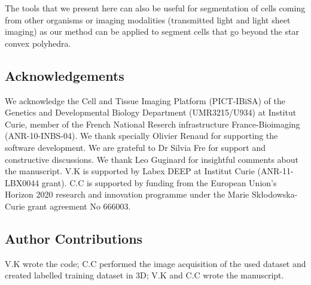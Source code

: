 \documentclass[letterpaper,compsoc,twoside]{IEEEtran}
\begin{document}
The tools that we present here can also be useful for segmentation of cells coming from other organisms or imaging modalities (transmitted light and light sheet imaging) as our method can be applied to segment cells that go beyond the star convex polyhedra.

\subsection{Acknowledgements%
  \label{acknowledgements}%
}


We acknowledge the Cell and Tissue Imaging Platform (PICT-IBiSA) of the Genetics and Developmental Biology Department (UMR3215/U934) at Institut Curie, member of the French National Reserch infrastructure France-Bioimaging (ANR-10-INBS-04). We thank specially Olivier Renaud for supporting the software development. We are grateful to Dr Silvia Fre for support and constructive discussions. We thank Leo Guginard for insightful comments about the manuscript. V.K is supported by Labex DEEP at Institut Curie (ANR-11- LBX0044 grant). C.C is supported by funding from the European Union's Horizon 2020 research and innovation programme under the Marie Skłodowska-Curie grant agreement No 666003.

\subsection{Author Contributions%
  \label{author-contributions}%
}


V.K wrote the code; C.C performed the image acquisition of the used dataset and created labelled training dataset in 3D; V.K and C.C wrote the manuscript.


\end{document}
